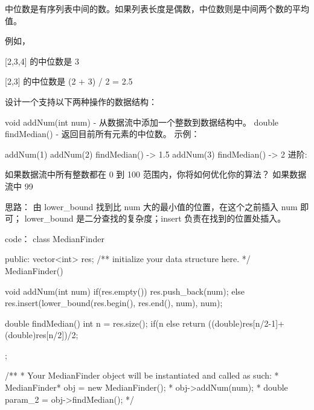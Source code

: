 中位数是有序列表中间的数。如果列表长度是偶数，中位数则是中间两个数的平均值。

例如，

[2,3,4] 的中位数是 3

[2,3] 的中位数是 (2 + 3) / 2 = 2.5

设计一个支持以下两种操作的数据结构：

void addNum(int num) - 从数据流中添加一个整数到数据结构中。
double findMedian() - 返回目前所有元素的中位数。
示例：

addNum(1)
addNum(2)
findMedian() -> 1.5
addNum(3) 
findMedian() -> 2
进阶:

如果数据流中所有整数都在 0 到 100 范围内，你将如何优化你的算法？
如果数据流中 99%




































思路：
由 lower_bound 找到比 num 大的最小值的位置，在这个之前插入 num 即可；
lower_bound 是二分查找的复杂度；insert 负责在找到的位置处插入。
































code：
class MedianFinder {
public:
    vector<int> res;
    /** initialize your data structure here. */
    MedianFinder() {
        
    }
    
    void addNum(int num) {
        if(res.empty())
            res.push_back(num);
        else res.insert(lower_bound(res.begin(), res.end(), num), num);
    }
    
    double findMedian() {
        int n = res.size();
        if(n%
        else return ((double)res[n/2-1]+(double)res[n/2])/2;
    }
};

/**
 * Your MedianFinder object will be instantiated and called as such:
 * MedianFinder* obj = new MedianFinder();
 * obj->addNum(num);
 * double param_2 = obj->findMedian();
 */